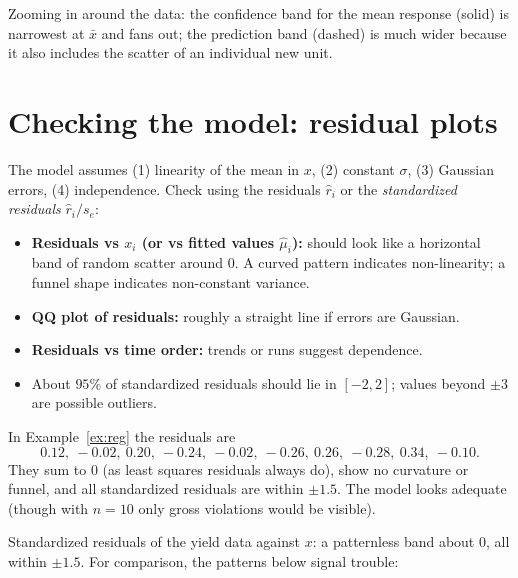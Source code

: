 Zooming in around the data: the confidence band for the mean response (solid) is narrowest
at $\bar x$ and fans out; the prediction band (dashed) is much wider because it also
includes the scatter of an individual new unit.

\section{Checking the model: residual plots}

The model assumes (1) linearity of the mean in $x$, (2) constant $\sigma$, (3)
Gaussian errors, (4) independence. Check using the residuals $\hat r_i$ or the
\emph{standardized residuals} $\hat r_i/s_e$:
\begin{itemize}
  \item \textbf{Residuals vs $x_i$ (or vs fitted values $\hat\mu_i$):} should look like
        a horizontal band of random scatter around $0$. A curved pattern indicates
        non-linearity; a funnel shape indicates non-constant variance.
  \item \textbf{QQ plot of residuals:} roughly a straight line if errors are Gaussian.
  \item \textbf{Residuals vs time order:} trends or runs suggest dependence.
  \item About $95\%$ of standardized residuals should lie in $[-2,2]$; values beyond
        $\pm3$ are possible outliers.
\end{itemize}

\begin{example}
In Example~\ref{ex:reg} the residuals are
\[ 0.12,\ -0.02,\ 0.20,\ -0.24,\ -0.02,\ -0.26,\ 0.26,\ -0.28,\ 0.34,\ -0.10. \]
They sum to $0$ (as least
squares residuals always do), show no curvature or funnel, and all standardized
residuals are within $\pm1.5$. The model looks adequate (though with $n=10$ only gross
violations would be visible).
\end{example}

\begin{center}
\end{center}
Standardized residuals of the yield data against $x$: a patternless band about $0$, all
within $\pm1.5$. For comparison, the patterns below signal trouble:

